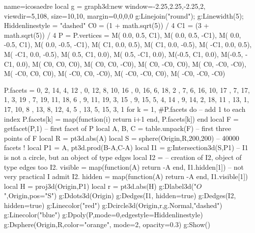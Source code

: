 \documentclass{standalone}
\begin{document}
    \begin{luadraw}{name=icosaedre}
    local g = graph3d:new{ 
        window={-2.25,2.25,-2.25,2},
        viewdir={5,108}, 
        size={10,10}, 
        margin={0,0,0,0}
    }
    g:Linejoin("round"); g:Linewidth(5); Hiddenlinestyle = "dashed"
C0 = (1 + math.sqrt(5)) / 4
C1 = (3 + math.sqrt(5)) / 4
P = {}
P.vertices = {
  M( 0.0,  0.5,   C1),
  M( 0.0,  0.5,  -C1),
  M( 0.0, -0.5,   C1),
  M( 0.0, -0.5,  -C1),
  M(  C1,  0.0,  0.5),
  M(  C1,  0.0, -0.5),
  M( -C1,  0.0,  0.5),
  M( -C1,  0.0, -0.5),
  M( 0.5,   C1,  0.0),
  M( 0.5,  -C1,  0.0),
 M(-0.5,   C1,  0.0),
 M(-0.5,  -C1,  0.0),
 M(  C0,   C0,   C0),
 M(  C0,   C0,  -C0),
 M(  C0,  -C0,   C0),
 M(  C0,  -C0,  -C0),
 M( -C0,   C0,   C0),
 M( -C0,   C0,  -C0),
 M( -C0,  -C0,   C0),
 M( -C0,  -C0,  -C0) }

P.facets ={
{  0,  2, 14,  4, 12 },
{  0, 12,  8, 10, 16 },
{  0, 16,  6, 18,  2 },
{  7,  6, 16, 10, 17 },
{  7, 17,  1,  3, 19 },
{  7, 19, 11, 18,  6 },
{  9, 11, 19,  3, 15 },
{  9, 15,  5,  4, 14 },
{  9, 14,  2, 18, 11 },
{ 13,  1, 17, 10,  8 },
{ 13,  8, 12,  4,  5 },
{ 13,  5, 15,  3,  1 } }
for k = 1, #P.facets do  -- add 1 to each index
    P.facets[k] = map(function(i) return i+1  end, P.facets[k])
end
local F = getfacet(P,1) -- first facet of P
local A, B, C = table.unpack(F)  -- first three points of F
local R = pt3d.abs(A) 
local S = sphere(Origin,R,200,200) -- 40000 facets !
local P1 = {A, pt3d.prod(B-A,C-A)}
local I1 = g:Intersection3d(S,P1) -- I1 is not a circle, but an object of type edges
local I2 = {} -- creation of I2, object of type edges too
I2. visible = map(function(A) return -A end, I1.hidden[1]) -- not very practical I admit
I2. hidden = map(function(A) return -A end, I1.visible[1])
local H = proj3d(Origin,P1)
local r = pt3d.abs(H)
g:Dlabel3d("$O$",Origin,{pos="S"})
g:Ddots3d({Origin})
g:Dedges(I1, {hidden=true})
g:Dedges(I2, {hidden=true})
g:Linecolor("red")
g:Dcircle3d(Origin,r,g.Normal,"dashed")
g:Linecolor("blue")
g:Dpoly(P,{mode=0,edgestyle=Hiddenlinestyle})
g:Dsphere(Origin,R,{color="orange", mode=2, opacity=0.3})
g:Show() 
    \end{luadraw}
\end{document}
